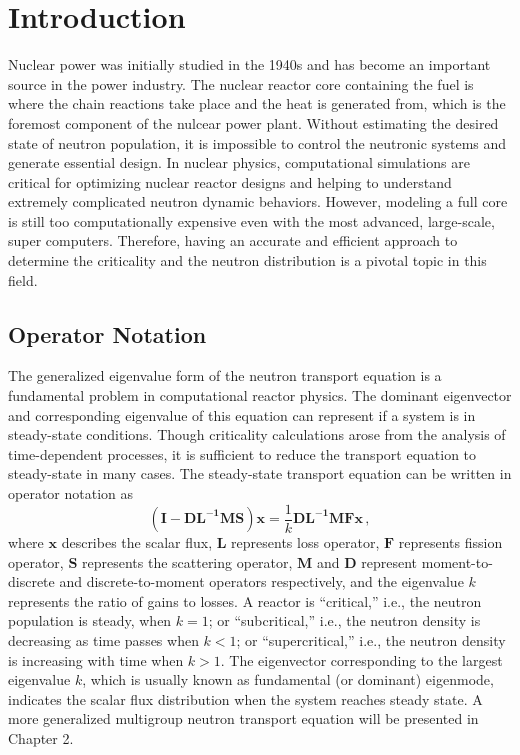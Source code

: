 \cleardoublepage

\chapter{Introduction}
\label{chapter:intro}
Nuclear power was initially studied in the 1940s and has become an important source in the power industry.
The nuclear reactor core containing the fuel is where the chain reactions take place and the heat is generated from, which is the foremost component of the nulcear power plant. 
Without estimating the desired state of neutron population, it is impossible to control the neutronic systems and generate essential design. 
In nuclear physics, computational simulations are critical for optimizing nuclear reactor designs and helping to understand extremely complicated neutron dynamic behaviors.
However, modeling a full core is still too computationally expensive even with the most advanced, large-scale, super computers. 
Therefore, having an accurate and efficient approach to determine the criticality and the neutron distribution is a pivotal topic in this field.

\section{Operator Notation}
The generalized eigenvalue form of the neutron transport equation is a fundamental problem in computational reactor physics.
The dominant eigenvector and corresponding eigenvalue of this equation can represent if a system is in steady-state conditions.
Though criticality calculations arose from the analysis of time-dependent processes, it is sufficient to reduce the transport equation to steady-state in many cases. 
The steady-state transport equation can be written in operator notation as
\begin{equation}
 \mathbf{(I - DL^{-1}MS)} \mathbf{\mathbf{x}} = \frac{1}{k} \mathbf{DL^{-1}MF} \mathbf{\mathbf{x}}  \, ,
 \label{eq:keig}
\end{equation}
where $\mathbf{\mathbf{x}} $ describes the scalar flux, $\mathbf{L}$ represents loss operator,  $\mathbf{F}$ represents fission operator, $\mathbf{S}$ represents the scattering operator, $\mathbf{M}$ and $\mathbf{D}$ represent moment-to-discrete and discrete-to-moment operators respectively, and the eigenvalue $k$ represents the ratio of gains to losses.
A reactor is ``critical,'' i.e., the neutron population is steady, when $k = 1$; or ``subcritical,'' i.e., the neutron density is decreasing as time passes when $k < 1$; or ``supercritical,'' i.e., the neutron density is increasing with time when $k>1$.
The eigenvector corresponding to the largest eigenvalue $k$, which is usually known as fundamental (or dominant) eigenmode, indicates the scalar flux distribution when the system reaches steady state.
A more generalized multigroup neutron transport equation will be presented in Chapter 2.

